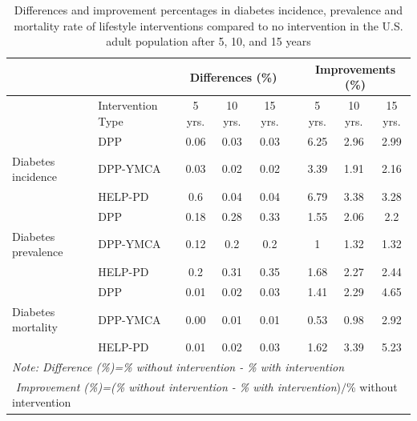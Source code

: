 \documentclass[fleqn,10pt]{wlscirep}
\begin{document}
\begin{table}[ht]
\centering
\begin{tabular}{llccccccc}
\hline
& & \multicolumn{3}{c}{Differences (\%)}& & \multicolumn{3}{c}{Improvements (\%)}\\
\hline
& Intervention Type & 5 yrs. & 10 yrs. & 15 yrs. &  & 5 yrs. & 10 yrs. & 15 yrs.\\
\hline
& DPP & 0.06 & 0.03 & 0.03 & & 6.25 & 2.96 & 2.99\\
Diabetes incidence & DPP-YMCA & 0.03 & 0.02 & 0.02 & & 3.39 & 1.91 & 2.16\\
& HELP-PD & 0.6 & 0.04 & 0.04 & & 6.79 & 3.38 & 3.28\\
\hline
& DPP & 0.18 & 0.28 & 0.33 & & 1.55 & 2.06 & 2.2\\
Diabetes prevalence & DPP-YMCA & 0.12 & 0.2 & 0.2 & & 1 & 1.32 & 1.32\\
& HELP-PD & 0.2 & 0.31 & 0.35 & & 1.68 & 2.27 & 2.44\\
\hline
& DPP & 0.01 & 0.02 & 0.03 & & 1.41 & 2.29 & 4.65\\
Diabetes mortality & DPP-YMCA & 0.00 & 0.01 & 0.01 & & 0.53 & 0.98 & 2.92\\
& HELP-PD & 0.01 & 0.02 & 0.03 & & 1.62 & 3.39 & 5.23\\
\hline
\multicolumn{9}{l}{\textit{Note: Difference (\%)=\% without intervention - \% with intervention}}\\
\multicolumn{9}{l}{\textit{\qquad \,\,Improvement (\%)=(\% without intervention - \% with intervention})$/$\% without intervention}
\end{tabular}
\caption{\label{tab:inc-pre}Differences and improvement percentages in diabetes incidence, prevalence and mortality rate of lifestyle interventions compared to no intervention in the U.S. adult population after 5, 10, and 15 years}
\end{table}
\end{document}
